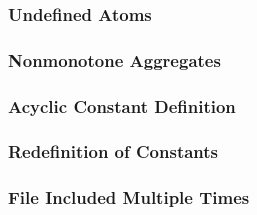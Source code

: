 \subsubsection{Undefined Atoms}\label{sec:warn:undefatm}
\tbf

\subsubsection{Nonmonotone Aggregates}\label{sec:warn:nonmon}
\tbf

\subsubsection{Acyclic Constant Definition}\label{sec:warn:cycdef}
\tbf

\subsubsection{Redefinition of Constants}\label{sec:warn:redef}
\tbf

\subsubsection{File Included Multiple Times}\label{sec:warn:incfile}
\tbf

